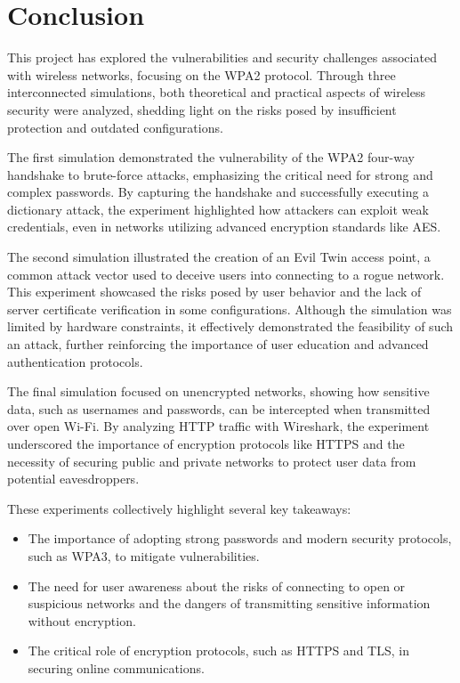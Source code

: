 \chapter{Conclusion}

This project has explored the vulnerabilities and security challenges associated with wireless networks, focusing on the WPA2 protocol. Through three interconnected simulations, both theoretical and practical aspects of wireless security were analyzed, shedding light on the risks posed by insufficient protection and outdated configurations.

The first simulation demonstrated the vulnerability of the WPA2 four-way handshake to brute-force attacks, emphasizing the critical need for strong and complex passwords. By capturing the handshake and successfully executing a dictionary attack, the experiment highlighted how attackers can exploit weak credentials, even in networks utilizing advanced encryption standards like AES.

The second simulation illustrated the creation of an Evil Twin access point, a common attack vector used to deceive users into connecting to a rogue network. This experiment showcased the risks posed by user behavior and the lack of server certificate verification in some configurations. Although the simulation was limited by hardware constraints, it effectively demonstrated the feasibility of such an attack, further reinforcing the importance of user education and advanced authentication protocols.

The final simulation focused on unencrypted networks, showing how sensitive data, such as usernames and passwords, can be intercepted when transmitted over open Wi-Fi. By analyzing HTTP traffic with Wireshark, the experiment underscored the importance of encryption protocols like HTTPS and the necessity of securing public and private networks to protect user data from potential eavesdroppers.

These experiments collectively highlight several key takeaways:
\begin{itemize}
    \item The importance of adopting strong passwords and modern security protocols, such as WPA3, to mitigate vulnerabilities.
    \item The need for user awareness about the risks of connecting to open or suspicious networks and the dangers of transmitting sensitive information without encryption.
    \item The critical role of encryption protocols, such as HTTPS and TLS, in securing online communications.
\end{itemize}


